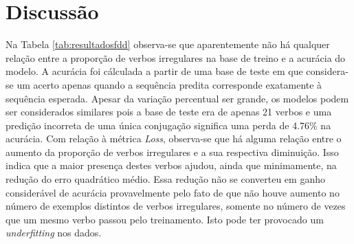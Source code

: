 

\section{Discussão}
\label{sec:disc}

Na Tabela \ref{tab:resultadosfdd} observa-se que aparentemente não há qualquer relação entre a proporção de verbos irregulares na base de treino e a acurácia do modelo. A acurácia foi cálculada a partir de uma base de teste em que considera-se um acerto apenas quando a sequência predita corresponde exatamente à sequência esperada. Apesar da variação percentual ser grande, os modelos podem ser considerados similares pois a base de teste era de apenas 21 verbos e uma predição incorreta de uma única conjugação significa uma perda de 4.76\% na acurácia. Com relação à métrica \textit{Loss}, observa-se que há alguma relação entre o aumento da proporção de verbos irregulares e a sua respectiva diminuição. Isso indica que a maior presença destes verbos ajudou, ainda que minimamente, na redução do erro quadrático médio. Essa redução não se converteu em ganho considerável de acurácia provavelmente pelo fato de que não houve aumento no número de exemplos distintos de verbos irregulares, somente no número de vezes que um mesmo verbo passou pelo treinamento. Isto pode ter provocado um \textit{underfitting} nos dados.

